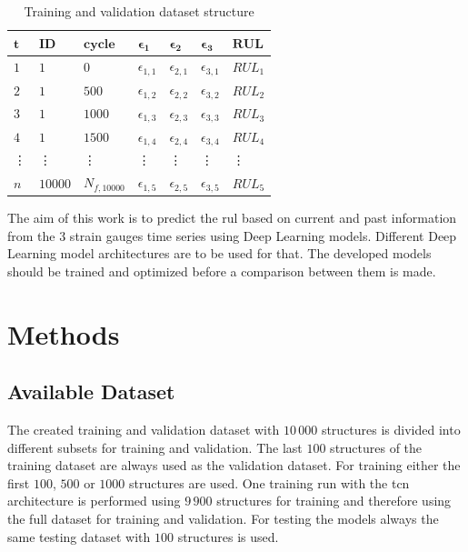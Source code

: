 \documentclass[conference]{IEEEtran}
\begin{document}
\begin{table}[htp]
	\centering
	\caption{Training and validation dataset structure}
	\label{tab:sliding_window_approach}
	\begin{tabular}{lllllll}
		$ \boldsymbol{t} $ & $ \boldsymbol{ID} $ & $ \boldsymbol{cycle} $ & $ \boldsymbol{\epsilon_1} $     & $ \boldsymbol{\epsilon_2} $     & $ \boldsymbol{\epsilon_3} $     & $ \boldsymbol{RUL} $   \\
		\hline
		$ 1 $ & $ 1 $  & $ 0 $     & $ \epsilon_{1,1} $ & $ \epsilon_{2,1} $ &  $ \epsilon_{3,1} $ &  $ RUL_1 $ \\
		$ 2 $ & $ 1 $  & $ 500 $   & $ \epsilon_{1,2} $ & $ \epsilon_{2,2} $ & $ \epsilon_{3,2} $ & $ RUL_2 $ \\
		$ 3 $ & $ 1 $  & $ 1000 $  & $ \epsilon_{1,3} $ & $ \epsilon_{2,3} $ & $ \epsilon_{3,3} $ & $ RUL_3 $ \\
		$ 4 $ & $ 1 $  & $ 1500 $  & $ \epsilon_{1,4} $ & $ \epsilon_{2,4} $ & $ \epsilon_{3,4} $ & $ RUL_4 $ \\
		\vdots & \vdots & \vdots & \vdots & \vdots &\vdots & \vdots \\
		$ n $ & $ 10000 $  & $ N_{f,10000} $  & $ \epsilon_{1,5} $ & $ \epsilon_{2,5} $ & $ \epsilon_{3,5} $ & $ RUL_5 $
	\end{tabular}
\end{table}

The aim of this work is to predict the \gls{rul} based on current and past information from the 3 strain gauges time series using Deep Learning models. Different Deep Learning model architectures are to be used for that. The developed models should be trained and optimized before a comparison between them is made.

\section{Methods}
\label{sec:methods}

\subsection{Available Dataset}
\label{sec:available_dataset}

The created training and validation dataset with $ 10\,000 $ structures is divided into different subsets for training and validation. The last $ 100 $ structures of the training dataset are always used as the validation dataset. For training either the first $ 100 $, $ 500 $ or $ 1000 $ structures are used. One training run with the \gls{tcn} architecture is performed using $ 9\,900 $ structures for training and therefore using the full dataset for training and validation. For testing the models always the same testing dataset with $ 100 $ structures is used.
\end{document}

